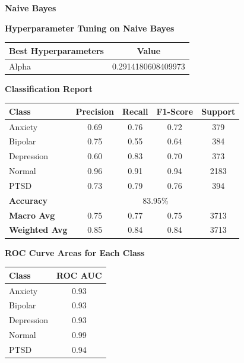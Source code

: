 \pagebreak


\vspace{1.5em}
\noindent
\textbf{Naive Bayes}
\begin{center}
    \textbf{Hyperparameter Tuning on Naive Bayes} \\[0.5em]
    \begin{tabular}{|l|c|}
        \hline
        \textbf{Best Hyperparameters}  & \textbf{Value} \\ \hline
        Alpha                         & 0.2914180608409973 \\ \hline
    \end{tabular}
\end{center}

\begin{center}
    \textbf{Classification Report} \\[0.5em]
    \begin{tabular}{|l|c|c|c|c|}
        \hline
        \textbf{Class} & \textbf{Precision} & \textbf{Recall} & \textbf{F1-Score} & \textbf{Support} \\ \hline
        Anxiety        & 0.69               & 0.76            & 0.72              & 379             \\ \hline
        Bipolar        & 0.75               & 0.55            & 0.64              & 384             \\ \hline
        Depression     & 0.60               & 0.83            & 0.70              & 373             \\ \hline
        Normal         & 0.96               & 0.91            & 0.94              & 2183            \\ \hline
        PTSD           & 0.73               & 0.79            & 0.76              & 394             \\ \hline
        \textbf{Accuracy} & \multicolumn{4}{|c|}{83.95\%} \\ \hline
        \textbf{Macro Avg} & 0.75            & 0.77            & 0.75              & 3713            \\ \hline
        \textbf{Weighted Avg} & 0.85         & 0.84            & 0.84              & 3713            \\ \hline
    \end{tabular}
\end{center}

\begin{center}
    \textbf{ROC Curve Areas for Each Class} \\[0.5em]
    \begin{tabular}{|l|c|}
        \hline
        \textbf{Class}  & \textbf{ROC AUC} \\ \hline
        Anxiety         & 0.93            \\ \hline
        Bipolar         & 0.93            \\ \hline
        Depression      & 0.93            \\ \hline
        Normal          & 0.99            \\ \hline
        PTSD            & 0.94            \\ \hline
    \end{tabular}
\end{center}

